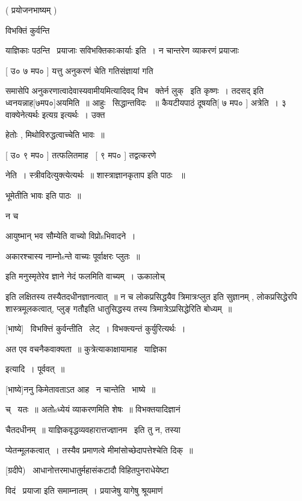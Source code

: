 \documentclass[11pt, openany]{book}
\begin{document}
 ( प्रयोजनभाष्यम् )

 विभक्तिं कुर्वन्ति \textendash\ 

 याज्ञिकाः पठन्ति \textendash\ {\qt प्रयाजाः सविभक्तिकाःकार्याः} इति~। न चान्तरेण
व्याकरणं प्रयाजाः



 [ उ० ७ मप० ] यत्तु अनुकरणं चेति गतिसंज्ञायां गति \textendash\ 

समासेपि अनुकरणात्वादेवास्यवामीयमित्यादिवद् विभ \textendash\ क्तेर्न लुक् \textendash\ इति
कृष्णः~। तदसद् इति ध्वनयन्नाह[७मप०]अयमिति~॥ आहुः \textendash\ सिद्धान्तविदः
~॥ कैयटीयपाठं दूषयति[ ७ मप० ] अत्रेति~। ३ {\qt वाक्येनेत्यर्थः}
इत्यग्र इत्यर्थः~। उक्त \textendash\ 

हेतोः , मिथोविरुद्धत्वाच्चेति भावः~॥

 [ उ० ९ मप० ] तत्फलितमाह \textendash\ [ ९ मप० ] तद्वत्करणे \textendash\ 

नेति~। स्त्रीवदित्युक्त्येत्यर्थः~॥ शास्त्राज्ञानकृताप इति पाठः
~॥

 भूमेतीति भावः इति पाठः~॥

 न च

 आयुष्भान् भव सौम्येति वाच्यो विप्रोsभिवादने~। 

 अकारश्चास्य नाम्नोsन्ते वाच्यः पूर्वाक्षरः प्लुतः~॥

 इति मनुस्मृतेरेव ज्ञाने नेदं फलमिति वाच्यम्~। {\qt ऊकालोच् \textendash\ }

इति लक्षितस्य तस्यैतदधीनज्ञानत्वात्~॥ न च लोकप्रसिद्धयैव
त्रिमात्रःप्लुत इति सुज्ञानम् , लोकप्रसिद्धेरपि शास्त्रमूलकत्वात्,
{\qt प्लुङ् गतौ}इति धातुसिद्धस्य तस्य त्रिमात्रेऽप्रसिद्धेरिति बोध्यम्~॥

 [भाष्ये] \textendash\ विभक्त्तिं कुर्वन्तीति \textendash\ लेट्~। विभक्त्यन्तं
कुर्युरित्यर्थः~। 

अत एव वचनैकवाक्यता~॥ कुत्रेत्याकाक्षायामाह \textendash\ याज्ञिका

इत्यादि~। पूर्ववत्~॥

[भाष्ये]ननु किमेतावताऽत आह \textendash\ न चान्तेति \textendash\ भाष्ये~॥

च् \textendash\ यतः~॥ अतोsध्येयं व्याकरणमिति शेषः~॥ विभक्तयादिज्ञानं

चैतदधीनम्~॥ याज्ञिकवृद्धव्यवहारात्तज्ज्ञानम \textendash\ इति तु न, तस्या \textendash\ 

प्येतन्मूलकत्वात्~। तस्यैव प्रमाणत्वे मीमांसोच्छेदापत्तेश्चेति दिक्~॥

[ग्रदीपे) \textendash\ आधानोत्तरमाधातुर्महासंकटादौ विहितपुनराधेयेष्टा \textendash\ 

विदं \textendash\ प्रयाजा इति समाम्नातम्~। प्रयाजेषु यागेषु श्रूयमाणं
\end{document}
